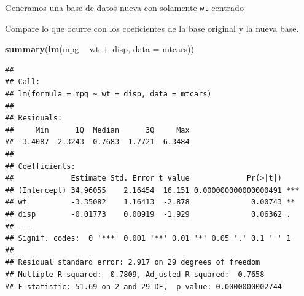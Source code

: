 \documentclass[
  12pt,
]{book}
\newenvironment{Shaded}{\begin{snugshade}}{\end{snugshade}}
\newcommand{\CommentTok}[1]{\textcolor[rgb]{0.56,0.35,0.01}{\textit{#1}}}
\newcommand{\DataTypeTok}[1]{\textcolor[rgb]{0.13,0.29,0.53}{#1}}
\newcommand{\KeywordTok}[1]{\textcolor[rgb]{0.13,0.29,0.53}{\textbf{#1}}}
\newcommand{\NormalTok}[1]{#1}
\newcommand{\OperatorTok}[1]{\textcolor[rgb]{0.81,0.36,0.00}{\textbf{#1}}}
\newcommand{\OtherTok}[1]{\textcolor[rgb]{0.56,0.35,0.01}{#1}}
\newcommand{\StringTok}[1]{\textcolor[rgb]{0.31,0.60,0.02}{#1}}
\theoremstyle{definition}
\theoremstyle{definition}
\theoremstyle{definition}
\theoremstyle{remark}
\begin{document}
Generamos una base de datos nueva con solamente \texttt{wt} centrado

\begin{Shaded}
\end{Shaded}

Compare lo que ocurre con los coeficientes de la base original y la nueva base.

\begin{Shaded}
\begin{Highlighting}[]
\KeywordTok{summary}\NormalTok{(}\KeywordTok{lm}\NormalTok{(mpg }\OperatorTok{~}\StringTok{ }\NormalTok{wt }\OperatorTok{+}\StringTok{ }\NormalTok{disp, }\DataTypeTok{data =}\NormalTok{ mtcars))}
\end{Highlighting}
\end{Shaded}

\begin{verbatim}
## 
## Call:
## lm(formula = mpg ~ wt + disp, data = mtcars)
## 
## Residuals:
##     Min      1Q  Median      3Q     Max 
## -3.4087 -2.3243 -0.7683  1.7721  6.3484 
## 
## Coefficients:
##             Estimate Std. Error t value             Pr(>|t|)    
## (Intercept) 34.96055    2.16454  16.151 0.000000000000000491 ***
## wt          -3.35082    1.16413  -2.878              0.00743 ** 
## disp        -0.01773    0.00919  -1.929              0.06362 .  
## ---
## Signif. codes:  0 '***' 0.001 '**' 0.01 '*' 0.05 '.' 0.1 ' ' 1
## 
## Residual standard error: 2.917 on 29 degrees of freedom
## Multiple R-squared:  0.7809, Adjusted R-squared:  0.7658 
## F-statistic: 51.69 on 2 and 29 DF,  p-value: 0.0000000002744
\end{verbatim}
\end{document}
